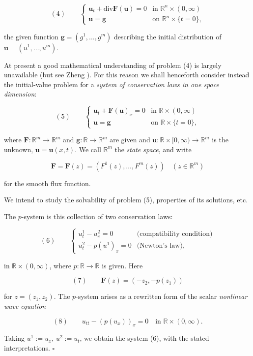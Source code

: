 $$(4) \qquad \begin{cases} \mathbf{u}_t + \text{div} \mathbf{F}(\mathbf{u}) = 0 & \text{in } \mathbb{R}^n \times (0, \infty) \\ \mathbf{u} = \mathbf{g} & \text{on } \mathbb{R}^n \times \{t = 0\}, \end{cases}$$

the given function $\mathbf{g} = (g^1, \ldots, g^m)$ describing the initial distribution of $\mathbf{u} = (u^1, \ldots, u^m)$.

At present a good mathematical understanding of problem (4) is largely unavailable (but see Zheng \cite{Zheng2001}). For this reason we shall henceforth consider instead the initial-value problem for a \textit{system of conservation laws in one space dimension}:

$$(5) \qquad \begin{cases} \mathbf{u}_t + \mathbf{F}(\mathbf{u})_x = 0 & \text{in } \mathbb{R} \times (0, \infty) \\ \mathbf{u} = \mathbf{g} & \text{on } \mathbb{R} \times \{t = 0\}, \end{cases}$$

where $\mathbf{F}: \mathbb{R}^m \to \mathbb{R}^m$ and $\mathbf{g}: \mathbb{R} \to \mathbb{R}^m$ are given and $\mathbf{u}: \mathbb{R} \times [0, \infty) \to \mathbb{R}^m$ is the unknown, $\mathbf{u} = \mathbf{u}(x,t)$. We call $\mathbb{R}^m$ the \textit{state space}, and write

$$\mathbf{F} = \mathbf{F}(z) = (F^1(z), \ldots, F^m(z)) \quad (z \in \mathbb{R}^m)$$

for the smooth flux function.

We intend to study the solvability of problem (5), properties of its solutions, etc.

\begin{example}
\label{ex:p-system-definition}
The $p$-system is this collection of two conservation laws:

$$(6) \qquad \begin{cases} u^1_t - u^2_x = 0 & \text{(compatibility condition)} \\ u^2_t - p(u^1)_x = 0 & \text{(Newton's law)}, \end{cases}$$

in $\mathbb{R}\times(0,\infty)$, where $p:\mathbb{R}\to\mathbb{R}$ is given. Here

$$(7) \qquad \mathbf{F}(z) = (-z_2, -p(z_1))$$

for $z=(z_1,z_2)$. The $p$-system arises as a rewritten form of the scalar \textit{nonlinear wave equation}

$$(8) \qquad u_{tt} - (p(u_x))_x = 0 \quad \text{in } \mathbb{R}\times(0,\infty).$$

Taking $u^1 := u_x$, $u^2 := u_t$, we obtain the system (6), with the stated interpretations. $\square$
\end{example}

